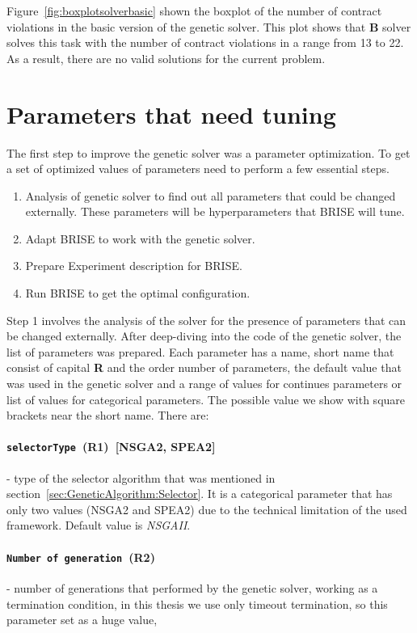 Figure~\ref{fig:boxplotsolverbasic} shown the boxplot of the number of contract violations in the basic version of the genetic solver. This plot shows that \textbf{B} solver solves this task with the number of contract violations in a range from 13 to 22. As a result, there are no valid solutions for the current problem.




\section{Parameters that need tuning}

The first step to improve the genetic solver was a parameter optimization. To get a set of optimized values of parameters need to perform a few essential steps.

\begin{enumerate}
	\item Analysis of genetic solver to find out all parameters that could be changed externally. These parameters will be hyperparameters that BRISE will tune.
	\item Adapt BRISE to work with the genetic solver.
	\item Prepare Experiment description for BRISE.
	\item Run BRISE to get the optimal configuration.
\end{enumerate}

Step 1 involves the analysis of the solver for the presence of parameters that can be changed externally. After deep-diving into the code of the genetic solver, the list of parameters was prepared. Each parameter has a name, short name that consist of capital \textbf{R} and the order number of parameters, the default value that was used in the genetic solver and a range of values for continues parameters or list of values for categorical parameters. The possible value we show with square brackets near the short name. There are:
\paragraph{\texttt{selectorType}~(R1)~[NSGA2, SPEA2]} - type of the selector algorithm that was mentioned in section~\ref{sec:GeneticAlgorithm:Selector}. It is a categorical parameter that has only two values (NSGA2 and SPEA2) due to the technical limitation of the used framework. Default value is \textit{NSGAII}.
\paragraph{\texttt{Number of generation}~(R2)} - number of generations that performed by the genetic solver, working as a termination condition, in this thesis we use only timeout termination, so this parameter set as a huge value,
